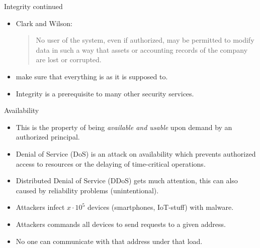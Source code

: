 \begin{frame}
  \begin{block}{Integrity continued}
    \begin{itemize}
      \item Clark and Wilson:
        \blockquote{No user of the system, even if authorized, may be permitted to 
          modify data in such a way that assets or accounting records of the 
          company are lost or corrupted.}

      \item \Ie make sure that everything is as it is supposed to.

      \item Integrity is a prerequisite to many other security services.
    \end{itemize}
  \end{block}
\end{frame}

\begin{frame}
  \begin{block}{Availability}
    \begin{itemize}
      \item This is the property of being \emph{available and usable} upon demand 
        by an authorized principal.

      \item Denial of Service (DoS) is an attack on availability which prevents 
        authorized access to resources or the delaying of time-critical 
        operations.

      \item Distributed Denial of Service (DDoS) gets much attention, this can 
        also caused by reliability problems (unintentional).
    \end{itemize}
  \end{block}
\end{frame}

\begin{frame}
  \begin{example}[DDoS]
    \begin{itemize}
      \item Attackers infect \(x\cdot 10^5\) devices (smartphones, IoT-stuff) 
        with malware.
      \item Attackers commands all devices to send requests to a given address.
      \item No one can communicate with that address under that load.
    \end{itemize}
  \end{example}
\end{frame}



\begin{frame}[allowframebreaks]
  \small
  \printbibliography
\end{frame}

